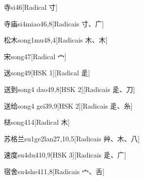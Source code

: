 \begin{entry}{寺}{si4}{6}[Radical ⼨]
\end{entry}

\begin{entry}{寺庙}{si4miao4}{6,8}[Radicais ⼨、⼴]
\end{entry}

\begin{entry}{松木}{song1mu4}{8,4}[Radicais ⽊、⽊]
\end{entry}

\begin{entry}{宋}{song4}{7}[Radical ⼧]
\end{entry}

\begin{entry}{送}{song4}{9}[HSK 1][Radical ⾡]
\end{entry}

\begin{entry}{送到}{song4 dao4}{9,8}[HSK 2][Radicais ⾡、⼑]
\end{entry}

\begin{entry}{送给}{song4 gei3}{9,9}[HSK 2][Radicais ⾡、⽷]
\end{entry}

\begin{entry}{㮸}{song4}{14}[Radical ⽊]
\end{entry}

\begin{entry}{苏格兰}{su1ge2lan2}{7,10,5}[Radicais ⾋、⽊、⼋]
\end{entry}

\begin{entry}{速度}{su4du4}{10,9}[HSK 3][Radicais ⾡、⼴]
\end{entry}

\begin{entry}{宿舍}{su4she4}{11,8}[Radicais ⼧、⾆]
\end{entry}

